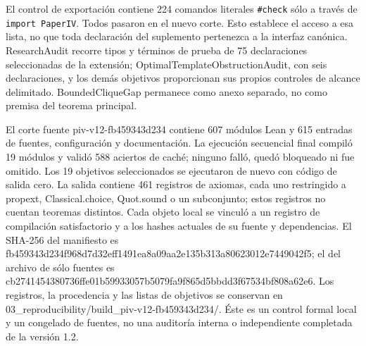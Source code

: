 \documentclass[spanish,11pt,a4paper]{article}
\begin{document}
El control de exportación contiene 224 comandos literales \nolinkurl{\#check} sólo a través de \texttt{import\ PaperIV}. Todos pasaron en el nuevo corte. Esto establece el acceso a esa lista, no que toda declaración del suplemento pertenezca a la interfaz canónica. ResearchAudit recorre tipos y términos de prueba de 75 declaraciones seleccionadas de la extensión; OptimalTemplateObstructionAudit, con seis declaraciones, y los demás objetivos proporcionan sus propios controles de alcance delimitado. BoundedCliqueGap permanece como anexo separado, no como premisa del teorema principal.

El corte fuente {\ttfamily\small piv-\discretionary{\hbox{\ensuremath{\hookrightarrow}}}{}{}v12-\discretionary{\hbox{\ensuremath{\hookrightarrow}}}{}{}fb459343d234} contiene 607 módulos Lean y 615 entradas de fuentes, configuración y documentación. La ejecución secuencial final compiló 19 módulos y validó 588 aciertos de caché; ninguno falló, quedó bloqueado ni fue omitido. Los 19 objetivos seleccionados se ejecutaron de nuevo con código de salida cero. La salida contiene 461 registros de axiomas, cada uno restringido a {\ttfamily\small propext}, {\ttfamily\small Classical.\discretionary{\hbox{\ensuremath{\hookrightarrow}}}{}{}choice}, {\ttfamily\small Quot.\discretionary{\hbox{\ensuremath{\hookrightarrow}}}{}{}sound} o un subconjunto; estos registros no cuentan teoremas distintos. Cada objeto local se vinculó a un registro de compilación satisfactorio y a los hashes actuales de su fuente y dependencias. El SHA-256 del manifiesto es {\ttfamily\small fb459343d234\discretionary{\hbox{\ensuremath{\hookrightarrow}}}{}{}f968d7d32eff\discretionary{\hbox{\ensuremath{\hookrightarrow}}}{}{}1491ea8a09aa\discretionary{\hbox{\ensuremath{\hookrightarrow}}}{}{}2e135b313a80\discretionary{\hbox{\ensuremath{\hookrightarrow}}}{}{}623012e74490\discretionary{\hbox{\ensuremath{\hookrightarrow}}}{}{}42f5}; el del archivo de sólo fuentes es {\ttfamily\small cb2741454380\discretionary{\hbox{\ensuremath{\hookrightarrow}}}{}{}736ffe01b599\discretionary{\hbox{\ensuremath{\hookrightarrow}}}{}{}33057b5079fa\discretionary{\hbox{\ensuremath{\hookrightarrow}}}{}{}9f865d5bbdd3\discretionary{\hbox{\ensuremath{\hookrightarrow}}}{}{}f67534bf808a\discretionary{\hbox{\ensuremath{\hookrightarrow}}}{}{}62e6}. Los registros, la procedencia y las listas de objetivos se conservan en {\ttfamily\small 03\_\discretionary{\hbox{\ensuremath{\hookrightarrow}}}{}{}reproducibil\discretionary{\hbox{\ensuremath{\hookrightarrow}}}{}{}ity/\discretionary{\hbox{\ensuremath{\hookrightarrow}}}{}{}build\_\discretionary{\hbox{\ensuremath{\hookrightarrow}}}{}{}piv-\discretionary{\hbox{\ensuremath{\hookrightarrow}}}{}{}v12-\discretionary{\hbox{\ensuremath{\hookrightarrow}}}{}{}fb459343d234\discretionary{\hbox{\ensuremath{\hookrightarrow}}}{}{}/}. Éste es un control formal local y un congelado de fuentes, no una auditoría interna o independiente completada de la versión 1.2.
\end{document}
